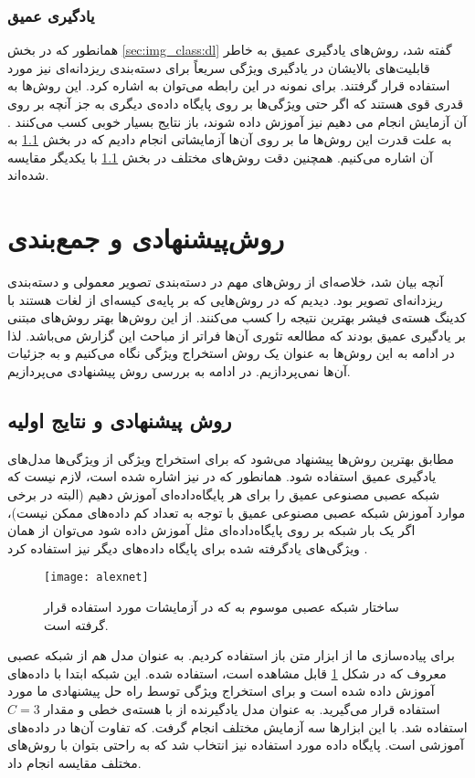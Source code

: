 \documentclass[11pt]{article}
\begin{document}
\subsubsection{یادگیری عمیق}

همانطور که در بخش
\ref{sec:img_class:dl}
گفته شد، روش‌های یادگیری عمیق به خاطر قابلیت‌های بالایشان در یادگیری ویژگی سریعاً برای دسته‌بندی ریزدانه‌ای نیز مورد استفاده قرار گرفتند. برای نمونه در این رابطه می‌توان به
\cite{razavian2014, krause2014, partrcnn}
اشاره کرد. این روش‌ها به قدری قوی هستند که اگر حتی ویژگی‌ها بر روی پایگاه داده‌ی دیگری به جز آنچه بر روی آن آزمایش انجام می دهیم نیز آموزش داده شوند، باز نتایج بسیار خوبی کسب می‌کنند
\cite{razavian2014}.
به علت قدرت این روش‌ها ما بر روی آن‌ها آزمایشاتی انجام دادیم که در بخش
\ref{sec:results}
به آن اشاره می‌کنیم. همچنین دقت روش‌های مختلف در بخش
\ref{sec:results}
با یکدیگر مقایسه شده‌اند.
\section{روش‌پیشنهادی و جمع‌بندی}\label{sec:conc}
آنچه بیان شد، خلاصه‌ای از روش‌های مهم در دسته‌بندی تصویر معمولی و دسته‌بندی ریزدانه‌ای تصویر بود. دیدیم که در روش‌هایی که بر پایه‌ی کیسه‌ای از لغات هستند با کدینگ هسته‌ی فیشر بهترین نتیجه را کسب می‌کنند. از این روش‌ها بهتر روش‌های مبتنی بر یادگیری عمیق بودند که مطالعه تئوری آن‌ها فراتر از مباحث این گزارش می‌باشد. لذا در ادامه به این روش‌ها به عنوان یک روش استخراج ویژگی نگاه می‌کنیم و به جزئیات آن‌ها نمی‌پردازیم. در ادامه به بررسی روش پیشنهادی می‌پردازیم.
\subsection{روش پیشنهادی و نتایج اولیه}\label{sec:results}
مطابق بهترین روش‌ها پیشنهاد می‌شود که برای استخراج ویژگی از ویژگی‌ها مدل‌های یادگیری عمیق استفاده شود. همانطور که در
\cite{razavian2014}
نیز اشاره شده است، لازم نیست که شبکه عصبی مصنوعی عمیق را برای هر پایگاه‌داده‌ای آموزش دهیم (البته در برخی موارد آموزش شبکه عصبی مصنوعی عمیق با توجه به تعداد کم داده‌های ممکن نیست)، اگر یک بار شبکه بر روی پایگاه‌داده‌ای مثل
 \cite{ilsvrc}
آموزش داده شود می‌توان از همان ویژگی‌های یادگرفته شده برای پایگاه داده‌های دیگر نیز استفاده کرد
\cite{razavian2014}.
\begin{figure}[t]
	\centering
	\texttt{[image: alexnet]}
	\caption{ساختار شبکه عصبی موسوم به
	\cite{alexnet} که در آزمایشات مورد استفاده قرار گرفته است.}
	\label{fig:conc:alexnet}
\end{figure}
برای پیاده‌سازی ما از ابزار متن باز
 \cite{caffe}
استفاده کردیم. به عنوان مدل هم از شبکه عصبی معروف
 \cite{alexnet}
که در شکل
\ref{fig:conc:alexnet} قابل مشاهده است، استفاده شده.
این شبکه ابتدا با داده‌های
 \cite{ilsvrc}
آموزش داده شده است و برای استخراج ویژگی توسط راه حل پیشنهادی ما مورد استفاده قرار می‌گیرید. به عنوان مدل یادگیرنده از
 \cite{svm}
با هسته‌ی خطی و مقدار
$C = 3$
استفاده شد. با این ابزارها سه آزمایش مختلف انجام گرفت. که تفاوت آن‌ها در داده‌های آموزشی است. پایگاه داده مورد استفاده نیز
 \cite{cub2002011}
انتخاب شد که به راحتی بتوان با روش‌های مختلف مقایسه انجام داد.
\end{document}
